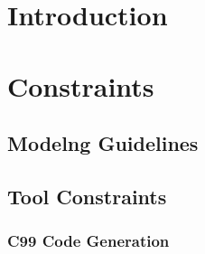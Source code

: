 \documentclass{template/openetcs_article}
\begin{document}
\tableofcontents
\listoffiguresandtables
\newpage




\section{Introduction}

\section{Constraints}
\label{sec:constraints}

\subsection{Modelng Guidelines}
\label{sec:modeling-guidelines}

\subsection{Tool Constraints}
\label{sec:tool-constraints}

\subsubsection{C99 Code Generation}
\end{document}
